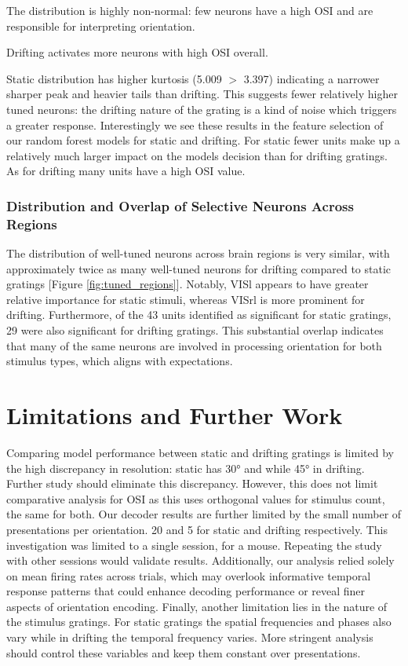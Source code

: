 \documentclass[10pt,twocolumn]{article}
\begin{document}
The distribution is highly non-normal: few neurons have a high OSI and are responsible for interpreting orientation.

Drifting activates more neurons with high OSI overall.

Static distribution has higher kurtosis (5.009 $>$ 3.397) indicating a narrower sharper peak and heavier tails than drifting. This suggests fewer relatively higher tuned neurons: the drifting nature of the grating is a kind of noise which triggers a greater response. Interestingly we see these results in the feature selection of our random forest models for static and drifting. For static fewer units make up a relatively much larger impact on the models decision than for drifting gratings. As for drifting many units have a high OSI value.

\subsubsection{Distribution and Overlap of Selective Neurons Across Regions}

The distribution of well-tuned neurons across brain regions is very similar, with approximately twice as many well-tuned neurons for drifting compared to static gratings [Figure \ref{fig:tuned_regions}]. Notably, VISl appears to have greater relative importance for static stimuli, whereas VISrl is more prominent for drifting. Furthermore, of the 43 units identified as significant for static gratings, 29 were also significant for drifting gratings. This substantial overlap indicates that many of the same neurons are involved in processing orientation for both stimulus types, which aligns with expectations.

\section{Limitations and Further Work}

Comparing model performance between static and drifting gratings is limited by the high discrepancy in resolution: static has 30° and while 45° in drifting. Further study should eliminate this discrepancy. However, this does not limit comparative analysis for OSI as this uses orthogonal values for stimulus count, the same for both. Our decoder results are further limited by the small number of presentations per orientation. 20 and 5 for static and drifting respectively. This investigation was limited to a single session, for a mouse. Repeating the study with other sessions would validate results. Additionally, our analysis relied solely on mean firing rates across trials, which may overlook informative temporal response patterns that could enhance decoding performance or reveal finer aspects of orientation encoding. Finally, another limitation lies in the nature of the stimulus gratings. For static gratings the spatial frequencies and phases also vary while in drifting the temporal frequency varies. More stringent analysis should control these variables and keep them constant over presentations.
\end{document}

